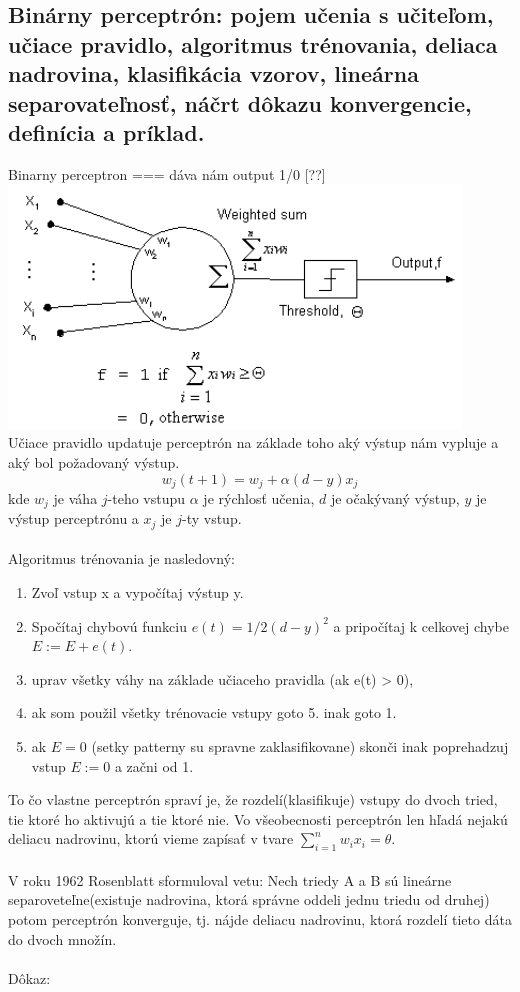 \documentclass{article}
\numberwithin{equation}{section} %
\begin{document}
\subsection{Binárny perceptrón: pojem učenia s učiteľom, učiace pravidlo, algoritmus trénovania, deliaca nadrovina, klasifikácia vzorov, lineárna separovateľnosť, náčrt dôkazu konvergencie, definícia a príklad.}
Binarny perceptron === dáva nám output 1/0 [??]\\
\includegraphics[width=12cm]{imgs/threshold_neuron}\\
Učiace pravidlo updatuje perceptrón na základe toho aký výstup nám vypluje a aký bol požadovaný výstup. 
$$ w_j(t+1) = w_j + \alpha (d-y)x_j $$
kde $w_j$ je váha $j$-teho vstupu $\alpha$ je rýchlosť učenia, $d$ je očakývaný výstup, $y$ je výstup perceptrónu a $x_j$ je $j$-ty vstup.
\\\\
Algoritmus trénovania je nasledovný:
\begin{enumerate}
\item Zvoľ vstup x a vypočítaj výstup y.
\item Spočítaj chybovú funkciu $e(t) = 1/2(d-y)^2$ a pripočítaj k celkovej chybe $E := E + e(t)$.
\item uprav všetky váhy na základe učiaceho pravidla (ak e(t) > 0),
\item ak som použil všetky trénovacie vstupy goto 5. inak goto 1.
\item ak $E = 0$ (setky patterny su spravne zaklasifikovane) skonči inak poprehadzuj vstup $ E := 0 $ a začni od 1.
\end{enumerate}
To čo vlastne perceptrón spraví je, že rozdelí(klasifikuje) vstupy do dvoch tried, tie ktoré ho aktivujú a tie ktoré nie. Vo všeobecnosti perceptrón len hľadá nejakú deliacu nadrovinu, ktorú vieme zapísať v tvare $\sum_{i=1}^n w_ix_i = \theta$.
\\\\
V roku 1962 Rosenblatt sformuloval vetu: Nech triedy A a B sú lineárne separoveteľne(existuje nadrovina, ktorá správne oddeli jednu triedu od druhej) potom perceptrón konverguje, tj. nájde deliacu nadrovinu, ktorá rozdelí tieto dáta do dvoch množín.
\\\\
Dôkaz:
\end{document}

